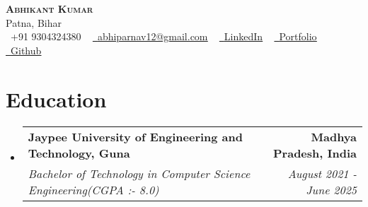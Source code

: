 \documentclass[letterpaper,11pt]{article}
\makeatletter
\newcommand{\resumeSubheading}[4]{
  \vspace{-2pt}\item
	\begin{tabular*}{1.0\textwidth}[t]{l@{\extracolsep{\fill}}r}
  	\textbf{#1} & \textbf{\small #2} \\
  	\textit{\small#3} & \textit{\small #4} \\
	\end{tabular*}\vspace{-7pt}
}
\newcommand{\resumeSubHeadingListStart}{\begin{itemize}[leftmargin=0.0in, label={}]}
\newcommand{\resumeSubHeadingListEnd}{\end{itemize}}
\makeatother
\begin{document}
 

\begin{center}
	{\Huge  {\scshape \textbf{Abhikant Kumar}}} \\ \vspace{3pt}
	Patna, Bihar  \\ \vspace{2pt}
	\small \raisebox{-0.1\height}\faPhone\ +91 9304324380 ~ \href{mailto:x@gmail.com}{\raisebox{-0.2\height}\faEnvelope\  \underline{abhiparnav12@gmail.com}} ~
	\href{https://linkedin.com/in//}{\raisebox{-0.2\height}\faLinkedin\ \underline{LinkedIn}} ~
   \href{https://abhikant-portfolio.netlify.app/}{\raisebox{-0.2\height}\faGlobe\ \underline{Portfolio}} ~ \href{https://github.com/abhikant12}{\raisebox{-0.2\height}\faGithub\ \underline{Github}}
\end{center}


\section{Education}
\begin{itemize}[leftmargin=0.12in, label={}]
  \vspace{-8pt}
  \resumeSubHeadingListStart
	\resumeSubheading
  	{Jaypee University of Engineering and Technology, Guna}{Madhya Pradesh, India}
  	{Bachelor of Technology in Computer Science Engineering(CGPA  :-  8.0)}{August 2021 - June 2025}
   \vspace{1pt}
  \resumeSubHeadingListEnd
\end{itemize} 



\end{document}
